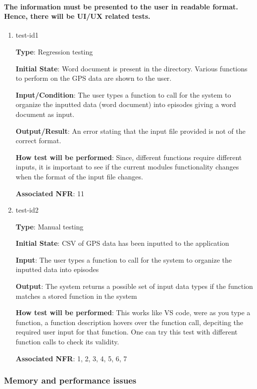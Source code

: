 \documentclass[12pt, titlepage]{article}
\begin{document}
\paragraph{The information must be presented to the user in readable format. Hence, there will be UI/UX related tests.}

\begin{enumerate}

\item{test-id1\\}

\textbf{Type}: Regression testing
					
\textbf{Initial State}: Word document is present in the directory. Various functions to perform on the GPS data are shown to the user.
					
\textbf{Input/Condition}: The user types a function to call for the system to organize the
inputted data (word document) into episodes giving a word document as input. 
					
\textbf{Output/Result}: An error stating that the input file provided is not of the correct format.
					
\textbf{How test will be performed}: Since, different functions require different inputs, it is important to see if the current modules functionality changes when the format of the input file changes.

\textbf{Associated NFR}: 11
\item{test-id2\\}

\textbf{Type}: Manual testing
					
\textbf{Initial State}: CSV of GPS data has been inputted to the application
					
\textbf{Input}: The user types a function to call for the system to organize the
inputted data into episodes
					
\textbf{Output}: The system returns a possible set of input data types if the function matches a stored function in the system
					
\textbf{How test will be performed}: This works like VS code, were as you type a function, a function description hovers over the function call, depciting the required user input for that function. One can try this test with different function calls to check its validity.

\textbf{Associated NFR}: 1, 2, 3, 4, 5, 6, 7 
\end{enumerate}

\subsubsection{Memory and performance issues}
\end{document}
